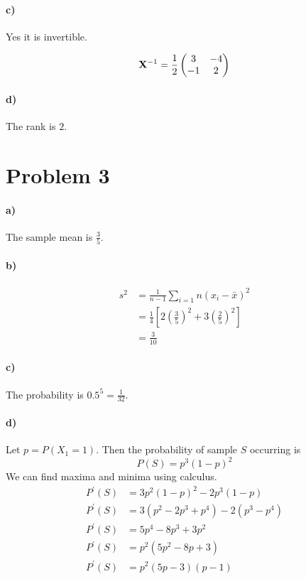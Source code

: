 \documentclass[12pt]{article}
\begin{document}
\paragraph{c)}

Yes it is invertible.

\[\mathbf{X}^{-1}=\frac{1}{2}\left(
        \begin{array}{@{}cc@{}}
                3&-4\\
                -1&2
        \end{array}
\right)\]

\paragraph{d)}

The rank is \(2\).

\section*{Problem 3}

\paragraph{a)}

The sample mean is \(\frac{3}{5}\).

\paragraph{b)}

\begin{align*}
        s^2&=\frac{1}{n-1}\sum_{i=1}{n}(x_i-\bar{x})^2\\
        &=\frac{1}{4}\left[2\left(\frac{3}{5}\right)^2+3\left(\frac{2}{5}\right)^2\right]\\
        &=\frac{3}{10}
\end{align*}

\paragraph{c)}

The probability is \(0.5^5=\frac{1}{32}\).

\paragraph{d)}

Let \(p=P\left(X_1=1\right)\). Then the probability of sample \(S\) occurring is
\[P(S)=p^3(1-p)^2\]
We can find maxima and minima using calculus.
\begin{align*}
        P^\prime(S)&=3p^2(1-p)^2-2p^3(1-p)\\
        P^\prime(S)&=3(p^2-2p^3+p^4)-2(p^3-p^4)\\
        P^\prime(S)&=5p^4-8p^3+3p^2\\
        P^\prime(S)&=p^2(5p^2-8p+3)\\
        P^\prime(S)&=p^2(5p-3)(p-1)\\
\end{align*}
\end{document}
